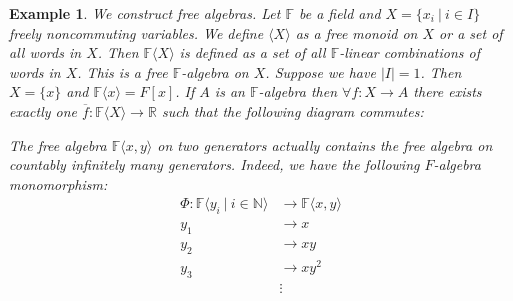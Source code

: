 \documentclass[10pt, a4paper]{article}
\newtheorem{example}[thm]{Example}
\newcommand{\N}{\mathbb {N}}
\newcommand{\R}{\mathbb {R}}
\newcommand{\F}{\mathbb {F}}
\begin{document}
\begin{example}
        We construct free algebras. Let $\F$ be a field and $X = \{x_i\ |\ i \in I\}$
        freely noncommuting variables. We define $\langle X \rangle$ as a free monoid on $X$ or a set of all words in $X$.
        Then $\F\langle X \rangle$ is defined as a set of all $\F$-linear combinations of words in $X$.
        This is a free $\F$-algebra on $X$. Suppose we have $|I| = 1$.
        Then $X = \{x\}$ and $\F\langle x\rangle = F[x]$.
        If $A$ is an $\F$-algebra then $\forall f: X \to A$ there exists exactly one $\overline{f}: \F\langle X \rangle \to \R$ such that the following diagram commutes:
        \begin{center}
          \end{center}
        The free algebra $\F\langle x, y\rangle$ on two generators actually contains the free algebra on countably infinitely many generators.
        Indeed, we have the following $F$-algebra monomorphism:
        \begin{align*}
            \Phi: \F \langle y_i \ |\ i \in \N\rangle &\to \F \langle x, y\rangle\\
            y_1 &\to x\\
            y_2 &\to xy\\
            y_3 &\to xy^2\\
            &\vdots
        \end{align*}
\end{example}
\end{document}
